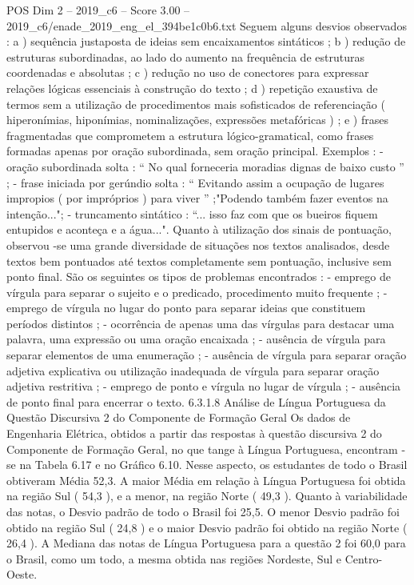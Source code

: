 \begin{textsample}{POS Dim 2 – 2019\_c6 – Score 3.00 – 2019\_c6/enade\_2019\_eng\_el\_394be1c0b6.txt}
Seguem alguns desvios observados : a ) sequência justaposta de ideias sem encaixamentos sintáticos ; b ) redução de estruturas subordinadas, ao lado do aumento na frequência de estruturas coordenadas e absolutas ; c ) redução no uso de conectores para expressar relações lógicas essenciais à construção do texto ; d ) repetição exaustiva de termos sem a utilização de procedimentos mais sofisticados de referenciação ( hiperonímias, hiponímias, nominalizações, expressões metafóricas ) ; e ) frases fragmentadas que comprometem a estrutura lógico-gramatical, como frases formadas apenas por oração subordinada, sem oração principal.
Exemplos : - oração subordinada solta : “ No qual forneceria moradias dignas de baixo custo ” ; - frase iniciada por gerúndio solta : “ Evitando assim a ocupação de lugares impropios ( por impróprios ) para viver ” ;"Podendo também fazer eventos na intenção..."; - truncamento sintático : “... isso faz com que os bueiros fiquem entupidos e aconteça e a água...".
Quanto à utilização dos sinais de pontuação, observou -se uma grande diversidade de situações nos textos analisados, desde textos bem pontuados até textos completamente sem pontuação, inclusive sem ponto final.
São os seguintes os tipos de problemas encontrados : - emprego de vírgula para separar o sujeito e o predicado, procedimento muito frequente ; - emprego de vírgula no lugar do ponto para separar ideias que constituem períodos distintos ; - ocorrência de apenas uma das vírgulas para destacar uma palavra, uma expressão ou uma oração encaixada ; - ausência de vírgula para separar elementos de uma enumeração ; - ausência de vírgula para separar oração adjetiva explicativa ou utilização inadequada de vírgula para separar oração adjetiva restritiva ; - emprego de ponto e vírgula no lugar de vírgula ; - ausência de ponto final para encerrar o texto. 6.3.1.8 Análise de Língua Portuguesa da Questão Discursiva 2 do Componente de Formação Geral Os dados de Engenharia Elétrica, obtidos a partir das respostas à questão discursiva 2 do Componente de Formação Geral, no que tange à Língua Portuguesa, encontram -se na Tabela 6.17 e no Gráfico 6.10.
Nesse aspecto, os estudantes de todo o Brasil obtiveram Média 52,3.
A maior Média em relação à Língua Portuguesa foi obtida na região Sul ( 54,3 ), e a menor, na região Norte ( 49,3 ).
Quanto à variabilidade das notas, o Desvio padrão de todo o Brasil foi 25,5.
O menor Desvio padrão foi obtido na região Sul ( 24,8 ) e o maior Desvio padrão foi obtido na região Norte ( 26,4 ).
A Mediana das notas de Língua Portuguesa para a questão 2 foi 60,0 para o Brasil, como um todo, a mesma obtida nas regiões Nordeste, Sul e Centro-Oeste.

\end{textsample}

